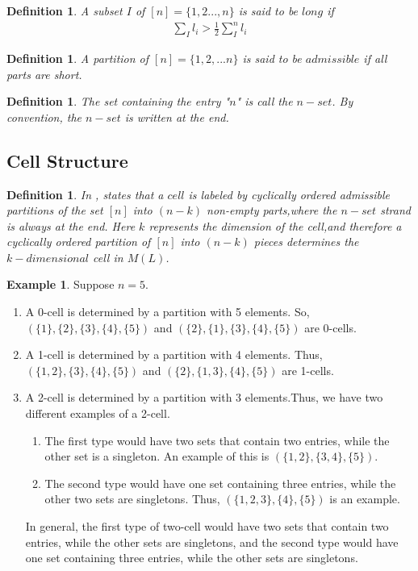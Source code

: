 \documentclass{amsart}
\newtheorem{Definition}[theorem]{Definition}
\newenvironment{definition}{\begin{Definition}\normalfont}{\end{Definition}}
\begin{document}
\begin{definition}
A subset $I$ of $[n]=\{1,2...,n\}$ is said to be $long$ if\\ 
\begin{align}
\sum_{I} l_i>\frac{1}{2}\sum_{I}^{n}l_i 
\end{align}
\end{definition}
\begin{definition}
A partition of $[n]=\{1,2,...n\}$ is said to be $admissible$ if all parts are short.
\end{definition}
\begin{definition}
The set containing the entry "$n$" is call the $n-set$. By convention, the $n-set$ is written at the end.
\end{definition}
\subsection{Cell Structure}
\begin{definition}
In \cite{}, states that a $cell$ is labeled by cyclically ordered admissible partitions of the set $[n]$ into $(n-k)$ non-empty parts,where the $n-set$ strand is always at the end. Here $k$ represents the dimension of the cell,and therefore a cyclically ordered partition of $[n]$ into $(n-k)$ pieces determines the $k-dimensional$ cell in $M(L)$.
\end{definition}
\theoremstyle{definition}\newtheorem{exmp}{Example}[section]
\begin{exmp} 

Suppose $n=5$.
\begin{enumerate}
\item 
A 0-cell is determined by a partition with 5 elements. So, $(\{1\},\{2\},\{3\},\{4\},\{5\})$ and $(\{2\},\{1\},\{3\},\{4\},\{5\})$ are 0-cells.
\item 
 A 1-cell is determined by a partition with 4 elements. Thus, $(\{1,2\},\{3\},\{4\},\{5\})$ and $(\{2\},\{1,3\},\{4\},\{5\})$ are 1-cells.
\item 
A 2-cell is determined by a partition with 3 elements.Thus, we have two different examples of a 2-cell.
\begin{enumerate}
\item
The first type would have two sets that contain two entries, while the other set is a singleton. An example of this is $(\{1,2\},\{3,4\},\{5\})$.
\item
The second type would have one set containing three entries, while the other two sets are singletons. Thus, 
$(\{1,2,3\},\{4\},\{5\})$ is an example.
\end{enumerate}
In general, the first type of two-cell would have two sets that contain two entries, while the other sets are singletons, and the second type would have one set containing three entries, while the other sets are singletons.
\end{enumerate}
\end{exmp}
\end{document}
